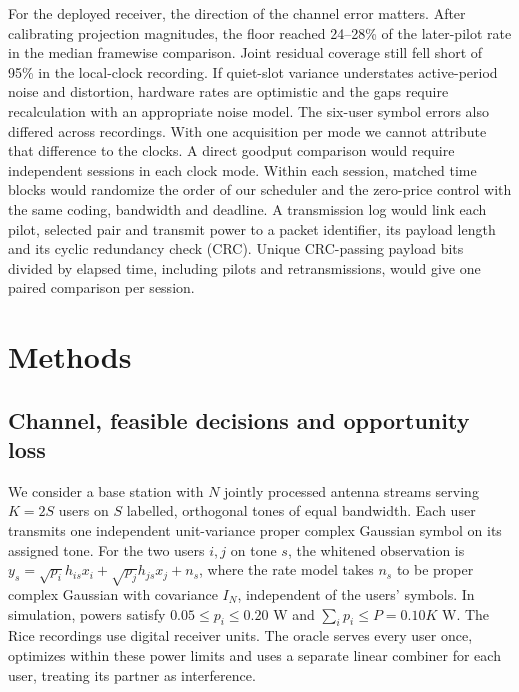 \documentclass[lineno,pdflatex,sn-nature]{sn-jnl}
\begin{document}
For the deployed receiver, the direction of the channel error matters. After calibrating projection magnitudes, the floor reached 24--28\% of the later-pilot rate in the median framewise comparison. Joint residual coverage still fell short of 95\% in the local-clock recording. If quiet-slot variance understates active-period noise and distortion, hardware rates are optimistic and the gaps require recalculation with an appropriate noise model. The six-user symbol errors also differed across recordings. With one acquisition per mode we cannot attribute that difference to the clocks. A direct goodput comparison would require independent sessions in each clock mode. Within each session, matched time blocks would randomize the order of our scheduler and the zero-price control with the same coding, bandwidth and deadline. A transmission log would link each pilot, selected pair and transmit power to a packet identifier, its payload length and its cyclic redundancy check (CRC). Unique CRC-passing payload bits divided by elapsed time, including pilots and retransmissions, would give one paired comparison per session.
\section*{Methods}
\subsection*{Channel, feasible decisions and opportunity loss}
We consider a base station with \(N\) jointly processed antenna streams serving \(K=2S\) users on \(S\) labelled, orthogonal tones of equal bandwidth. Each user transmits one independent unit-variance proper complex Gaussian symbol on its assigned tone. For the two users \(i,j\) on tone \(s\), the whitened observation is \(y_s=\sqrt{p_i}h_{is}x_i+\sqrt{p_j}h_{js}x_j+n_s\), where the rate model takes \(n_s\) to be proper complex Gaussian with covariance \(I_N\), independent of the users' symbols. In simulation, powers satisfy \(0.05\leq p_i\leq0.20\) W and \(\sum_i p_i\leq P=0.10K\) W. The Rice recordings use digital receiver units. The oracle serves every user once, optimizes within these power limits and uses a separate linear combiner for each user, treating its partner as interference.
\end{document}
